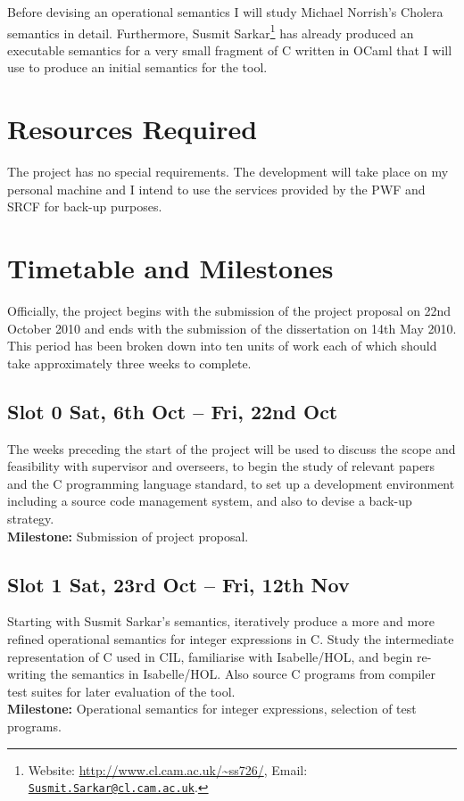 \documentclass[a4paper,12pt]{scrbook}
\theoremstyle{plain}
\theoremstyle{definition}
\begin{document}
Before devising an operational semantics I will study Michael Norrish's Cholera semantics in detail. Furthermore, Susmit Sarkar\footnote{Website: \url{http://www.cl.cam.ac.uk/~ss726/}, Email: \href{mailto:Susmit.Sarkar@cl.cam.ac.uk}{\nolinkurl{Susmit.Sarkar@cl.cam.ac.uk}}.} has already produced an executable semantics for a very small fragment of C written in OCaml that I will use to produce an initial semantics for the tool.

\section*{Resources Required}
The project has no special requirements. The development will take place on my personal machine and I intend to use the services provided by the PWF and SRCF for back-up purposes.

\section*{Timetable and Milestones}
Officially, the project begins with the submission of the project proposal on 22nd October 2010 and ends with the submission of the dissertation on 14th May 2010. This period has been broken down into ten units of work each of which should take approximately three weeks to complete.

\subsection*{Slot 0 \hfill {\small Sat, 6th Oct -- Fri, 22nd Oct}}
The weeks preceding the start of the project will be used to discuss the scope and feasibility with supervisor and overseers, to begin the study of relevant papers and the C programming language standard, to set up a development environment including a source code management system, and also to devise a back-up strategy.
\\
{\bfseries Milestone:} Submission of project proposal.

\subsection*{Slot 1 \hfill {\small Sat, 23rd Oct -- Fri, 12th Nov}}
Starting with Susmit Sarkar's semantics, iteratively produce a more and more refined operational semantics for integer expressions in C. Study the intermediate representation of C used in CIL, familiarise with Isabelle/HOL, and begin re-writing the semantics in Isabelle/HOL. Also source C programs from compiler test suites for later evaluation of the tool. 
\\
{\bfseries Milestone:} Operational semantics for integer expressions, selection of test programs.
\end{document}
